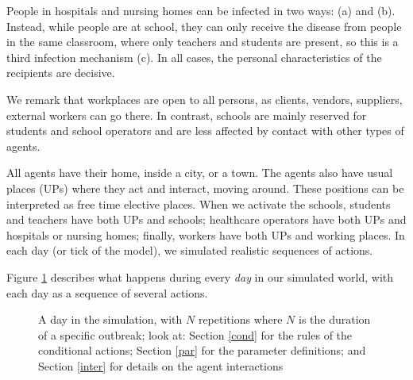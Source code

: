 \documentclass[graybox]{svmult}
\begin{document}
People in hospitals and nursing homes can be infected in two ways: (a) and (b). Instead, while people are at school, they can only receive the disease from people in the same classroom, where only teachers and students are present, so this is a third infection mechanism (c). In all cases, the personal characteristics of the recipients are decisive.

We remark that workplaces are open to all persons, as clients, vendors, suppliers, external workers can go there. In contrast, schools are mainly reserved for students and school operators and are less affected by contact with other types of agents.

All agents have their home, inside a city, or a town. The agents also have usual places (UPs) where they act and interact, moving around. These positions can be interpreted as free time elective places. When we activate the schools, students and teachers have both UPs and schools; healthcare operators have both UPs and hospitals or nursing homes; finally, workers have both UPs and working places. In each day (or tick of the model), we simulated realistic sequences of actions.




Figure \ref{outline} describes what happens during every \emph{day} in our simulated world, with each day as a sequence of several actions.

\begin{figure}[t]
\center
{}
\caption{A day in the simulation, with $N$ repetitions where $N$ is the duration of a specific outbreak; look at: Section \ref{cond} for the rules of the conditional actions; Section \ref{par} for the parameter definitions; and Section \ref{inter} for details on the agent interactions}
\label{outline}
\end{figure}
\end{document}
